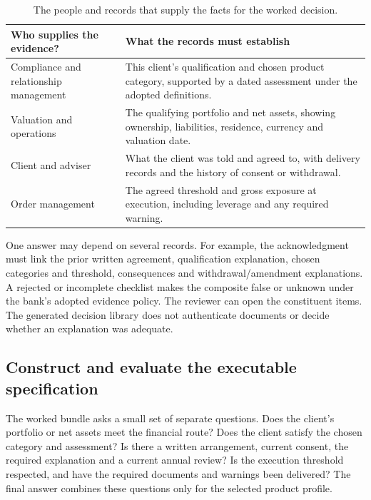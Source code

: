 \documentclass[12pt,a4paper,oneside,openany]{book}
\begin{document}
\begin{table}[H]
\centering
\caption{The people and records that supply the facts for the worked decision.}
\label{tab:demo-inputs-summary}
\begin{tabularx}{0.96\textwidth}{P{0.32\textwidth}Y}
\toprule
Who supplies the evidence? & What the records must establish \\ \midrule
Compliance and relationship management & This client's qualification and chosen product category, supported by a dated assessment under the adopted definitions. \\
\addlinespace[0.5em]
Valuation and operations & The qualifying portfolio and net assets, showing ownership, liabilities, residence, currency and valuation date. \\
\addlinespace[0.5em]
Client and adviser & What the client was told and agreed to, with delivery records and the history of consent or withdrawal. \\
\addlinespace[0.5em]
Order management & The agreed threshold and gross exposure at execution, including leverage and any required warning. \\
\bottomrule
\end{tabularx}
\end{table}


One answer may depend on several records. For example, the acknowledgment must link the prior
written agreement, qualification explanation, chosen categories and threshold,
consequences and withdrawal/amendment explanations. A rejected or incomplete
checklist makes the composite false or unknown under the bank's adopted evidence
policy. The reviewer can open the constituent items. The generated decision
library does not authenticate documents or decide whether an explanation was
adequate.

\subsection{Construct and evaluate the executable specification}
\label{merge:P-01b-complete-dry-run:04}


The worked bundle asks a small set of separate questions. Does the client's
portfolio or net assets meet the financial route? Does the client satisfy the
chosen category and assessment? Is there a written arrangement, current consent,
the required explanation and a current annual review? Is the execution threshold
respected, and have the required documents and warnings been delivered? The
final answer combines these questions only for the selected product profile.
\end{document}
